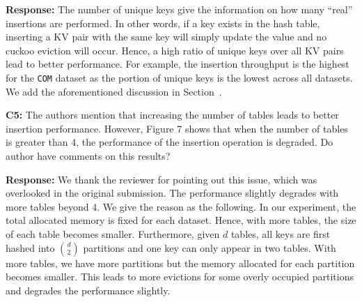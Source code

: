 \noindent\textbf{Response:} 
The number of unique keys give the information on how many ``real'' insertions are performed. In other words, if a key exists in the hash table, inserting a KV pair with the same key will simply update the value and no cuckoo eviction will occur. Hence, a high ratio of unique keys over all KV pairs lead to better performance. For example, the insertion throughput is the highest for the {\tt COM} dataset as the portion of unique keys is the lowest across all datasets. We add the aforementioned discussion in Section~.

\begin{shaded}
	\noindent\textbf{C5:} The authors mention that increasing the number of tables leads to better insertion performance. However, Figure 7 shows that when the number of tables is greater than 4, the performance of the insertion operation is degraded. Do author have comments on this results?
\end{shaded}

\noindent\textbf{Response:} We thank the reviewer for pointing out this issue, which was overlooked in the original submission. The performance slightly degrades with more tables beyond 4. We give the reason as the following. In our experiment, the total allocated memory is fixed for each dataset. 
Hence, with more tables, the size of each table becomes smaller. Furthermore, given $d$ tables, all keys are first hashed into $\binom{d}{2}$ partitions and one key can only appear in two tables. 
With more tables, we have more partitions but the memory allocated for each partition becomes smaller. This leads to more evictions for some overly occupied partitions and degrades the performance slightly. 